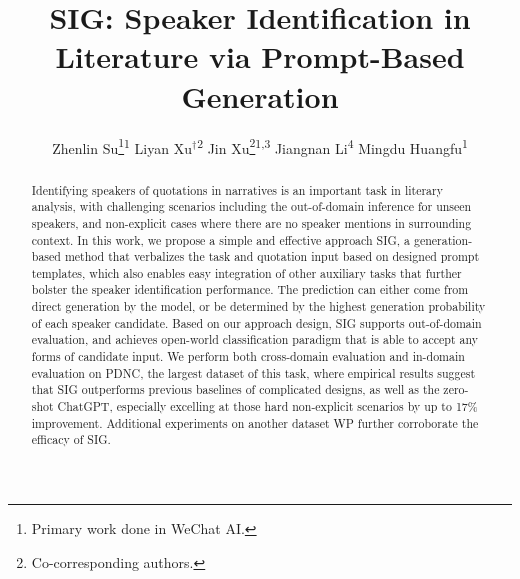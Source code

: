 \documentclass[letterpaper]{article} %
\title{SIG: Speaker Identification in Literature via Prompt-Based Generation}
\author {
    Zhenlin Su\thanks{Primary work done in WeChat AI.}\textsuperscript{\rm 1}\;
    Liyan Xu$^\dagger$\textsuperscript{\rm 2}\;
    Jin Xu\thanks{Co-corresponding authors.}\textsuperscript{\rm 1,3}\;
    Jiangnan Li\textsuperscript{\rm 4}\;
    Mingdu Huangfu\textsuperscript{\rm 1}
}
\begin{document}
\maketitle

\begin{abstract}

Identifying speakers of quotations in narratives is an important task in literary analysis, with challenging scenarios including the out-of-domain inference for unseen speakers, and non-explicit cases where there are no speaker mentions in surrounding context.
In this work, we propose a simple and effective approach SIG, a generation-based method that verbalizes the task and quotation input based on designed prompt templates, which also enables easy integration of other auxiliary tasks that further bolster the speaker identification performance. The prediction can either come from direct generation by the model, or be determined by the highest generation probability of each speaker candidate. Based on our approach design, SIG supports out-of-domain evaluation, and achieves open-world classification paradigm that is able to accept any forms of candidate input. We perform both cross-domain evaluation and in-domain evaluation on PDNC, the largest dataset of this task, where empirical results suggest that SIG outperforms previous baselines of complicated designs, as well as the zero-shot ChatGPT, especially excelling at those hard non-explicit scenarios by up to 17\% improvement. Additional experiments on another dataset WP further corroborate the efficacy of SIG.



\end{abstract}
\end{document}
